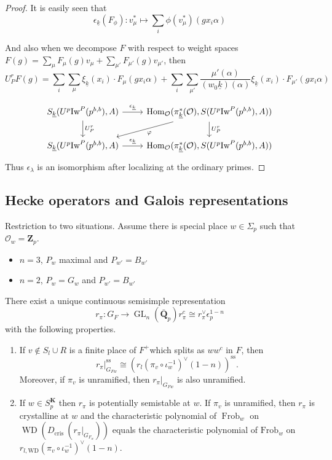 \documentclass[leqno]{amsart}
\newcommand{\wt}[1]{\underline{ #1 }}
\newcommand{\Iw}{\textnormal{Iw}}
\DeclareMathOperator{\GL}{GL}
\newcommand{\Q}{{\mathbf{Q}}}
\newcommand{\Zp}{\mathbf{Z}_p}
\newcommand{\K}{{\mathbf{K}}} %
\newcommand{\oo}{\mathcal{O}} %
\DeclareMathOperator{\Hom}{Hom}
\theoremstyle{definition}
\theoremstyle{remark}
\begin{document}
\begin{proof}
	It is easily seen that 
	\[
		\epsilon_{\wt{k}}(F_\phi)\colon 
		v_\mu^*\mapsto \sum_i\phi(v_\mu^*)(gx_i\alpha)
	\]
	
	And also when we decompose $F$ with respect to weight spaces
	 $F(g)=\sum_\mu F_\mu(g)v_\mu+\sum_{\mu'}F_{\mu'}(g)v_{\mu'}$, 
	 then 
	 \[
	 	U_P^rF(g)=
		\sum_i
		\sum_\mu \xi_{\wt{k}}(x_i)\cdot F_\mu(gx_i\alpha)
		+
		\sum_i
		\sum_{\mu'}\frac{\mu'(\alpha)}{(w_0\wt{k})(\alpha)}
		\xi_{\wt{k}}(x_i)\cdot F_{\mu'}(gx_i\alpha)
	 \]



	\[
	\begin{tikzcd}
		S_{\wt{k}}(U^p\Iw^P(p^{b,b}),A)
		\arrow[r,"\epsilon_{\wt{k}}"]
		\arrow[d,"U_P^r"]
		& \Hom_\oo(\pi^*_{\wt{k}}(\oo), S(U^p\Iw^P(p^{b,b}),A))
		\arrow[d,"U_P^r"]
		\arrow[dl,"\varphi"]\\
		S_{\wt{k}}(U^p\Iw^P(p^{b,b}),A)
		\arrow[r,"\epsilon_{\wt{k}}"]
		& \Hom_\oo(\pi^*_{\wt{k}}(\oo), S(U^p\Iw^P(p^{b,b}),A))
	\end{tikzcd}	
	\]
	Thus $\epsilon_{\lambda}$ is an isomorphism
	after localizing at the ordinary primes. 

\end{proof}

\subsection{Hecke operators and Galois representations}

Restriction to two situations.
Assume there is special place $w\in \Sigma_p$
such that  $\oo_w=\Zp$.
 \begin{itemize}
	\item $n=3$, $P_w$ maximal and  $  P_{w'}=B_{w'}$
	\item  $n=2$,  $P_w=G_w$ and $  P_{ w' } =B_{w'}$
\end{itemize}

There exist a unique continuous semisimple representation
\[
r_\pi: G_F \rightarrow \GL_n(\bar{\Q}_p)
r_\pi^c \cong r_\pi^{\vee} \epsilon_p^{1-n}
\]
with the following properties.
\begin{enumerate}[label=(\alph*)]
\item If $v \notin S_l \cup R$ is a finite place of $F^{+}$which splits as $w w^c$ in $F$, then
\[
\left.r_\pi\right|_{G_{F w}} ^{\mathrm{ss}} \cong\left(r_l\left(\pi_v \circ \iota_w^{-1}\right)^{\vee}(1-n)\right)^{\mathrm{ss}} .
\]
Moreover, if $\pi_v$ is unramified, then $\left.r_\pi\right|_{G_{F w}}$ is also unramified.
\item If $w\in S_p^\K$ then $r_\pi$ is potentially semistable at $w$.
If $\pi_v$ is unramified, then $r_\pi$ is crystalline at $w$
and the characteristic polynomial of 
$\operatorname{Frob}_w$ on $\operatorname{WD}\left(D_{\text {cris }}\left(\left.r_\pi\right|_{G_{F_w}}\right)\right)$ equals the characteristic polynomial of $\mathrm{Frob}_w$ on $r_{l, \mathrm{WD}}\left(\pi_v \circ \iota_w^{-1}\right)^{\vee}(1-n)$.

\end{enumerate}
\end{document}
